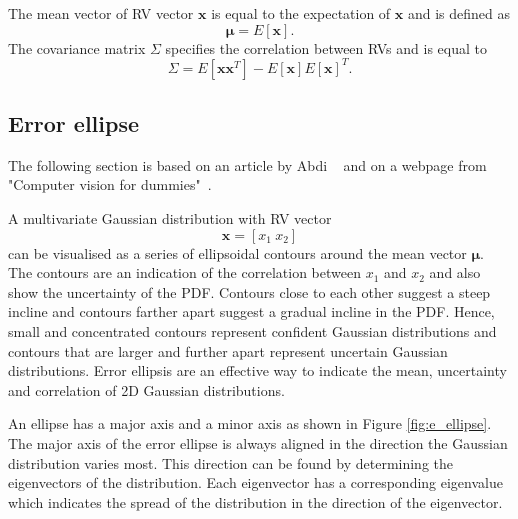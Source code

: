 \documentclass[12pt,oneside,openany,a4paper, %
afrikaans,english,
]{memoir}
\numberwithin{equation}{chapter}
\begin{document}
The mean vector of RV vector $\bm{x}$ is equal to the expectation of $\bm{x}$ and is defined as
\begin{equation}
\bm{\mu} = E[\bm{x}].
\end{equation}
The covariance matrix $\Sigma$ specifies the correlation between RVs and is equal to
\begin{equation}
\Sigma = E[\bm{xx}^T] - E[\bm{x}]E[\bm{x}]^T.
\end{equation}
\subsection{Error ellipse}The following section is based on an article by Abdi ~\cite{abdi} and on a webpage from "Computer vision for dummies"~\cite{draw_ellipse}.

A multivariate Gaussian distribution with RV vector
\begin{equation}
\bm{x} = [x_1\ x_2]
\end{equation}
can be visualised as a series of ellipsoidal contours around the mean vector $\bm{\mu}$. The contours are an indication of the correlation between $x_1$ and $x_2$ and also show the uncertainty of the PDF. Contours close to each other suggest a steep incline and contours farther apart suggest a gradual incline in the PDF. Hence, small and concentrated contours represent confident Gaussian distributions and contours that are larger and further apart represent uncertain Gaussian distributions. Error ellipsis are an effective way to indicate the mean, uncertainty and correlation of 2D Gaussian distributions.

An ellipse has a major axis and a minor axis as shown in Figure \ref{fig:e_ellipse}. The major axis of the error ellipse is always aligned in the direction the Gaussian distribution varies most. This direction can be found by determining the eigenvectors of the distribution. Each eigenvector has a corresponding eigenvalue which indicates the spread of the distribution in the direction of the eigenvector. 
\end{document}
